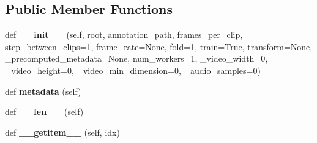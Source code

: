 \subsection*{Public Member Functions}
\begin{DoxyCompactItemize}
\item 
\mbox{\label{classtorchvision_1_1datasets_1_1hmdb51_1_1HMDB51_af398139908199f098c53560bbb910ea7}} 
def {\bfseries \+\_\+\+\_\+init\+\_\+\+\_\+} (self, root, annotation\+\_\+path, frames\+\_\+per\+\_\+clip, step\+\_\+between\+\_\+clips=1, frame\+\_\+rate=None, fold=1, train=True, transform=None, \+\_\+precomputed\+\_\+metadata=None, num\+\_\+workers=1, \+\_\+video\+\_\+width=0, \+\_\+video\+\_\+height=0, \+\_\+video\+\_\+min\+\_\+dimension=0, \+\_\+audio\+\_\+samples=0)
\item 
\mbox{\label{classtorchvision_1_1datasets_1_1hmdb51_1_1HMDB51_aad29ef51a2bb523c564cb48a869814c7}} 
def {\bfseries metadata} (self)
\item 
\mbox{\label{classtorchvision_1_1datasets_1_1hmdb51_1_1HMDB51_ab25c14a6fe9f181278d74e266bdc658d}} 
def {\bfseries \+\_\+\+\_\+len\+\_\+\+\_\+} (self)
\item 
\mbox{\label{classtorchvision_1_1datasets_1_1hmdb51_1_1HMDB51_a3ccf3a6dedb7b1a30099117d0c331c35}} 
def {\bfseries \+\_\+\+\_\+getitem\+\_\+\+\_\+} (self, idx)
\end{DoxyCompactItemize}
